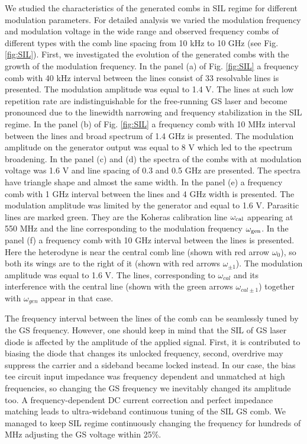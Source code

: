 \documentclass[a4paper, amsfonts, amssymb, amsmath, reprint, showkeys, nofootinbib, twoside,longbibliography, aps]{revtex4-1}
\begin{document}
We studied the characteristics of the generated combs in SIL regime for different modulation parameters. For detailed analysis we varied the modulation frequency and modulation voltage in the wide range and observed frequency combs of different types with the comb line spacing from 10 kHz to 10 GHz (see Fig. \ref{fig:SIL}). 
First, we investigated the evolution of the generated combs with the growth of the modulation frequency. 
 In the panel (a) of Fig. \ref{fig:SIL} a frequency comb with 40 kHz interval between the lines consist of 33 resolvable lines is presented. The modulation amplitude was equal to 1.4 V. The lines at such low repetition rate are indistinguishable for the free-running GS laser and become pronounced due to the linewidth narrowing and frequency stabilization in the SIL regime. In the panel (b) of Fig. \ref{fig:SIL} a frequency comb with 10 MHz interval between the lines and broad spectrum of 1.4 GHz is presented. The modulation amplitude on the generator output was equal to 8 V which led to the spectrum broadening. In the panel (c) and (d) the spectra of the combs with at modulation voltage was 1.6 V and line spacing of 0.3 and 0.5 GHz are presented. The spectra have triangle shape and almost the same width. In the panel (e) a frequency comb with 1 GHz interval between the lines and 4 GHz width is presented. The modulation amplitude was limited by the generator and equal to 1.6 V. Parasitic lines are marked green. They are the Koheras calibration line $\omega_{\rm cal}$ appearing at 550 MHz and the line corresponding to the modulation frequency $\omega_{\rm gen}$. In the panel (f) a frequency comb with 10 GHz interval between the lines is presented. Here the heterodyne is near the central comb line (shown with red arrow $\omega_0$), so both its wings are to the right of it (shown with red arrows $\omega_{\pm 1}$). The modulation amplitude was equal to 1.6 V. The lines, corresponding to $\omega_{cal}$ and its interference with the central line (shown with the green arrows $\omega_{cal \pm 1}$) together with $\omega_{gen}$ appear in that case. 
 

 
The frequency interval between the lines of the comb can be seamlessly tuned by the GS frequency. However, one should keep in mind that the SIL of GS laser diode is affected by the amplitude of the applied signal. First, it is contributed to biasing the diode that changes its unlocked frequency, second, overdrive may suppress the carrier and a sideband became locked instead. In our case, the bias tee circuit input impedance was frequency dependent and unmatched at high frequencies, so changing the GS frequency we inevitably changed its amplitude too. A frequency-dependent DC current correction and perfect impedance matching leads to ultra-wideband continuous tuning of the SIL GS comb. We managed to keep SIL regime continuously changing the frequency for hundreds of MHz adjusting the GS voltage within 25\%.
 
\end{document}
